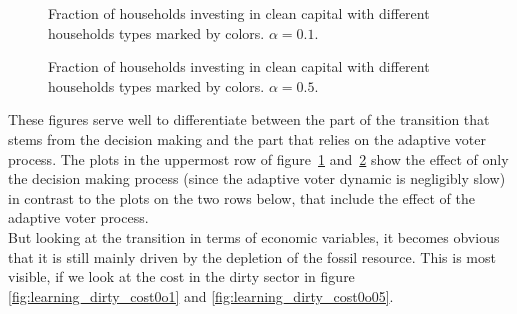 \begin{figure}[t]
	\centering
	\caption{Fraction of households investing in clean capital with different households types marked by colors. $\alpha=0.1$.}
	\label{fig:learning_decisions0o1}
\end{figure}

\begin{figure}[t]
	\centering
	\caption{Fraction of households investing in clean capital with different households types marked by colors. $\alpha=0.5$.}
	\label{fig:learning_decisions0o05}
\end{figure}
These figures serve well to differentiate between the part of the transition that stems from the decision making and the part that relies on the adaptive voter process.
The plots in the uppermost row of figure~\ref{fig:learning_decisions0o1} and~\ref{fig:learning_decisions0o05} show the effect of only the decision making process (since the adaptive voter dynamic is negligibly slow) in contrast to the plots on the two rows below, that include the effect of the adaptive voter process.\\

But looking at the transition in terms of economic variables, it becomes obvious that it is still mainly driven by the depletion of the fossil resource. This is most visible, if we look at the cost in the dirty sector in figure \ref{fig:learning_dirty_cost0o1} and \ref{fig:learning_dirty_cost0o05}.

